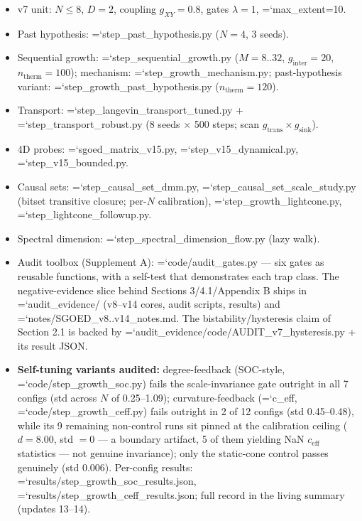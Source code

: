\documentclass[12pt,a4paper]{article}
\providecommand{\tightlist}{%
  \setlength{\itemsep}{0pt}\setlength{\parskip}{0pt}}
\renewcommand{\texttt}[1]{{\ttfamily\hyphenchar\font=`\-\relax #1}}
\begin{document}
\begin{itemize}
\tightlist
\item
  v7 unit: \(N\le8\), \(D=2\), coupling \(g_{XY}=0.8\), gates
  \(\lambda=1\), \texttt{max\_extent=10}.
\item
  Past hypothesis: \texttt{step\_past\_hypothesis.py} (\(N=4\), 3
  seeds).
\item
  Sequential growth: \texttt{step\_sequential\_growth.py} (\(M=8..32\),
  \(g_{\mathrm{inter}}=20\), \(n_{\mathrm{therm}}=100\)); mechanism:
  \texttt{step\_growth\_mechanism.py}; past-hypothesis variant:
  \texttt{step\_growth\_past\_hypothesis.py}
  (\(n_{\mathrm{therm}}=120\)).
\item
  Transport: \texttt{step\_langevin\_transport\_tuned.py} +
  \texttt{step\_transport\_robust.py} (8 seeds \(\times\) 500 steps;
  scan \(g_{\mathrm{trans}}\times g_{\mathrm{sink}}\)).
\item
  4D probes: \texttt{sgoed\_matrix\_v15.py},
  \texttt{step\_v15\_dynamical.py}, \texttt{step\_v15\_bounded.py}.
\item
  Causal sets: \texttt{step\_causal\_set\_dmm.py},
  \texttt{step\_causal\_set\_scale\_study.py} (bitset transitive
  closure; per-\(N\) calibration), \texttt{step\_growth\_lightcone.py},
  \texttt{step\_lightcone\_followup.py}.
\item
  Spectral dimension: \texttt{step\_spectral\_dimension\_flow.py} (lazy
  walk).
\item
  Audit toolbox (Supplement A): \texttt{code/audit\_gates.py} --- six
  gates as reusable functions, with a self-test that demonstrates each
  trap class. The negative-evidence slice behind Sections 3/4.1/Appendix
  B ships in \texttt{audit\_evidence/} (v8--v14 cores, audit scripts,
  results) and \texttt{notes/SGOED\_v8..v14\_notes.md}. The
  bistability/hysteresis claim of Section 2.1 is backed by
  \texttt{audit\_evidence/code/AUDIT\_v7\_hysteresis.py} + its result
  JSON.
\item
  \textbf{Self-tuning variants audited:} degree-feedback (SOC-style,
  \texttt{code/step\_growth\_soc.py}) fails the scale-invariance gate
  outright in all 7 configs (std across \(N\) of 0.25--1.09);
  curvature-feedback (\texttt{c\_eff},
  \texttt{code/step\_growth\_ceff.py}) fails outright in 2 of 12 configs
  (std 0.45--0.48), while its 9 remaining non-control runs sit pinned at
  the calibration ceiling (\(d=8.00\), std \(=0\) --- a boundary
  artifact, 5 of them yielding NaN \(c_{\mathrm{eff}}\) statistics ---
  not genuine invariance); only the static-cone control passes genuinely
  (std 0.006). Per-config results:
  \texttt{results/step\_growth\_soc\_results.json},
  \texttt{results/step\_growth\_ceff\_results.json}; full record in the
  living summary (updates 13--14).
\end{itemize}
\end{document}
